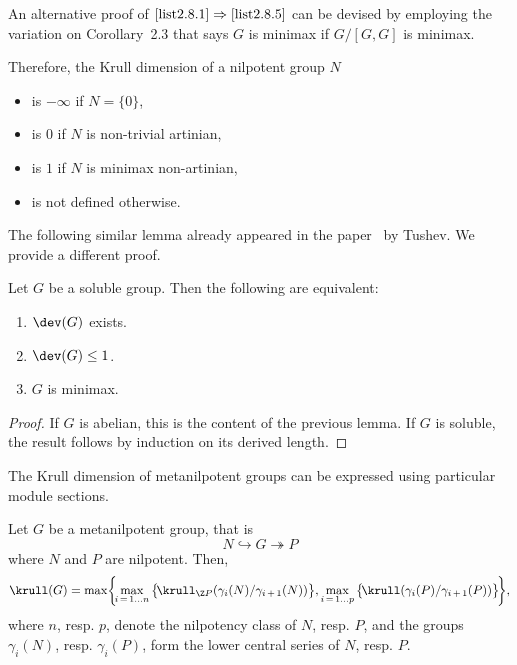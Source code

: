An alternative proof of $\eqref{list2.8.1}\Rightarrow\eqref{list2.8.5}$ can be devised by employing the variation on Corollary~2.3 that says $G$ is minimax if $G/[G,G]$ is minimax.



\begin{rema}
Therefore, the Krull dimension of a nilpotent group $N$
\begin{itemize}\romanenumi
\item \label{list2.9.1}is $-\infty$ if $N = \{0\}$,
\item \label{list2.9.2}is $0$ if $N$ is non-trivial artinian,
\item \label{list2.9.3}is $1$ if $N$ is minimax non-artinian,
\item \label{list2.9.4}is not defined otherwise.
\end{itemize}
\end{rema}

The following similar lemma already appeared in the paper~\cite{Tus} by Tushev. We provide a different proof.
\goodbreak
\begin{lemm}\label{lem-deviation soluble}
Let $G$ be a soluble group. Then the following are equivalent:
\begin{enumerate}
\item \label{list2.10.1}$\dev(G)$ exists.
\item \label{list2.10.2}$\dev(G)\le 1$.
\item \label{list2.10.3}$G$ is minimax.
\end{enumerate}
\end{lemm}


\begin{proof}
If $G$ is abelian, this is the content of the previous lemma. If $G$ is soluble, the result follows by induction on its derived length.
\end{proof}


The Krull dimension of metanilpotent groups can be expressed using particular module sections.

\begin{prop}
Let $G$ be a metanilpotent group, that is
\begin{equation*}
N \hookrightarrow G \twoheadrightarrow P
\end{equation*}
where $N$ and $P$ are nilpotent. Then,
\begin{equation*}
\krull(G) = \max\!\left\{\!\max\limits_{i\,=\,1\dots n} \big\{\!\krull_{\Z P}(\gamma_i(N)/\gamma_{i\,+\,1}(N))\big\}, \max\limits_{i\,=\,1\dots p} \big\{\!\krull(\gamma_i(P)/\gamma_{i\,+\,1}(P))\big\}\!\right\}\!,
\end{equation*}
where $n$, resp. $p$, denote the nilpotency class of $N$, resp. $P$, and the groups $\gamma_i(N)$, resp. $\gamma_i(P)$, form the lower central series of $N$, resp. $P$.
\end{prop}

